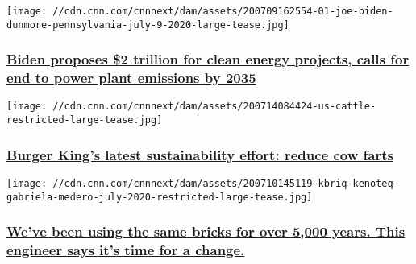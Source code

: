 \href{/2020/07/14/politics/joe-biden-clean-energy-plan/index.html}{}

\texttt{[image: //cdn.cnn.com/cnnnext/dam/assets/200709162554-01-joe-biden-dunmore-pennsylvania-july-9-2020-large-tease.jpg]}

\hypertarget{biden-proposes-2-trillion-for-clean-energy-projects-calls-for-end-to-power-plant-emissions-by-2035}{%
\subsubsection{\texorpdfstring{\href{/2020/07/14/politics/joe-biden-clean-energy-plan/index.html}{Biden
proposes \$2 trillion for clean energy projects, calls for end to power
plant emissions by
2035}}{Biden proposes \$2 trillion for clean energy projects, calls for end to power plant emissions by 2035}}\label{biden-proposes-2-trillion-for-clean-energy-projects-calls-for-end-to-power-plant-emissions-by-2035}}

\href{/2020/07/14/business/burger-king-cow-diet/index.html}{}

\texttt{[image: //cdn.cnn.com/cnnnext/dam/assets/200714084424-us-cattle-restricted-large-tease.jpg]}

\hypertarget{burger-kings-latest-sustainability-effort-reduce-cow-farts}{%
\subsubsection{\texorpdfstring{\href{/2020/07/14/business/burger-king-cow-diet/index.html}{Burger
King's latest sustainability effort: reduce cow
farts}}{Burger King's latest sustainability effort: reduce cow farts}}\label{burger-kings-latest-sustainability-effort-reduce-cow-farts}}

\href{/style/article/going-green-kbriq-sustainable-brick-spc-intl/index.html}{}

\texttt{[image: //cdn.cnn.com/cnnnext/dam/assets/200710145119-kbriq-kenoteq-gabriela-medero-july-2020-restricted-large-tease.jpg]}

\hypertarget{weve-been-using-the-same-bricks-for-over-5000-years-this-engineer-says-its-time-for-a-change}{%
\subsubsection{\texorpdfstring{\href{/style/article/going-green-kbriq-sustainable-brick-spc-intl/index.html}{We've
been using the same bricks for over 5,000 years. This engineer says it's
time for a
change.}}{We've been using the same bricks for over 5,000 years. This engineer says it's time for a change.}}\label{weve-been-using-the-same-bricks-for-over-5000-years-this-engineer-says-its-time-for-a-change}}

